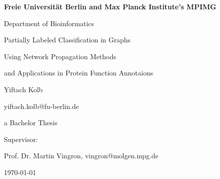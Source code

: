 \begin{titlepage}
	\centering
    {\bf\large Freie Universität Berlin and
    Max Planck Institute's MPIMG}
    \par Department of Bioinformatics
    {\scshape\LARGE \par Partially Labeled
    Classification in Graphs}
    {\scshape\Large\par Using Network Propagation Methods 
    \par and Applications in Protein Function Annotaions}
    \vfill
  	{\Large Yiftach Kolb \par}
    {yiftach.kolb@fu-berlin.de}
    \vfill
  	{\Large a Bachelor Thesis\par}
    \vfill
	  {\Large Supervisor: \par
    Prof. Dr. Martin Vingron, \normalsize vingron@molgen.mpg.de 
    \par}
    {\large \today\par}
\end{titlepage}

